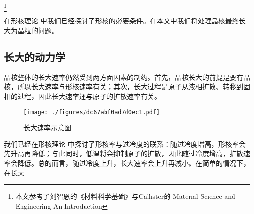 
\footnote{本文参考了刘智恩的《材料科学基础》与Callister的 Material Science and Engineering An Introduction}

在形核理论  中我们已经探讨了形核的必要条件。在本文中我们将处理晶核最终长大为晶粒的问题。

\subsection{长大的动力学}
晶核整体的长大速率仍然受到两方面因素的制约。首先，晶核长大的前提是要有晶核，所以长大速率与形核速率有关；其次，长大过程是原子从液相扩散、转移到固相的过程，因此长大速率还与原子的扩散速率有关。
\begin{figure}[ht]
\centering
\texttt{[image: ./figures/dc67abf0ad7d0ec1.pdf]}
\caption{长大速率示意图} \label{fig_GGRW_1}
\end{figure}

我们已经在形核理论  中探讨了形核率与过冷度的联系：随过冷度增高，形核率会先升高再降低；与此同时，低温将会抑制原子的扩散，因此随过冷度增高，扩散速率会降低。总的而言，随过冷度上升，长大速率会上升再减小。在简单的情况下，在长大
